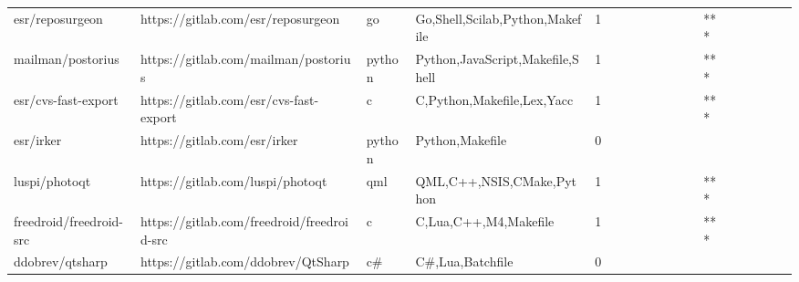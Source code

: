 \begin{tabular}{llllrlllllllllllll}
esr/reposurgeon                                    &                 https://gitlab.com/esr/reposurgeon &                go &                    Go,Shell,Scilab,Python,Makefile &       1 &         &        &           &                &                 &        &           &       *** &          &          &       &              &          \\
mailman/postorius                                  &               https://gitlab.com/mailman/postorius &            python &                   Python,JavaScript,Makefile,Shell &       1 &         &        &           &                &                 &        &           &       *** &          &          &       &              &          \\
esr/cvs-fast-export                                &             https://gitlab.com/esr/cvs-fast-export &                 c &                         C,Python,Makefile,Lex,Yacc &       1 &         &        &           &                &                 &        &           &       *** &          &          &       &              &          \\
esr/irker                                          &                       https://gitlab.com/esr/irker &            python &                                    Python,Makefile &       0 &         &        &           &                &                 &        &           &           &          &          &       &              &          \\
luspi/photoqt                                      &                   https://gitlab.com/luspi/photoqt &               qml &                          QML,C++,NSIS,CMake,Python &       1 &         &        &           &                &                 &        &           &       *** &          &          &       &              &          \\
freedroid/freedroid-src                            &         https://gitlab.com/freedroid/freedroid-src &                 c &                              C,Lua,C++,M4,Makefile &       1 &         &        &           &                &                 &        &           &       *** &          &          &       &              &          \\
ddobrev/qtsharp                                    &                 https://gitlab.com/ddobrev/QtSharp &                c\# &                                   C\#,Lua,Batchfile &       0 &         &        &           &                &                 &        &           &           &          &          &       &              &          \\

\end{tabular}
